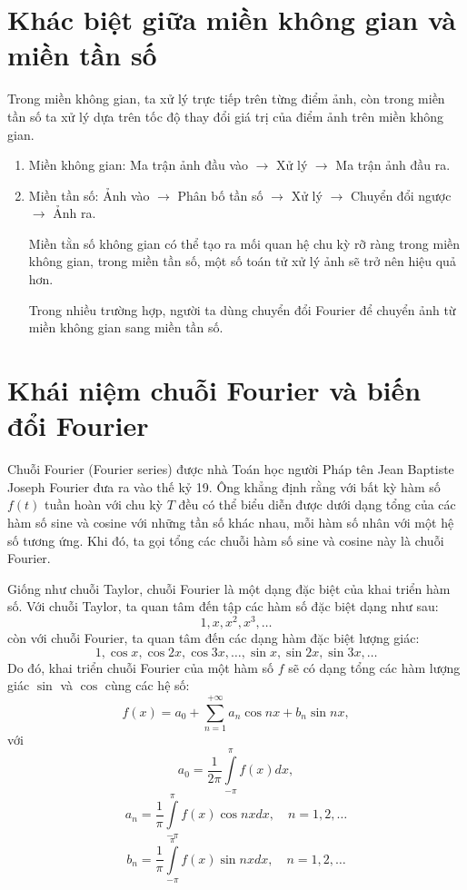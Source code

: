 \documentclass[12pt,a4paper]{report}
\numberwithin{equation}{section}
\theoremstyle{definition} %
\begin{document}
\section{Khác biệt giữa miền không gian và miền tần số}
Trong miền không gian, ta xử lý trực tiếp trên từng điểm ảnh, còn trong miền tần số ta xử lý dựa trên tốc độ thay đổi giá trị của điểm ảnh trên miền không gian.

\begin{enumerate}
    \item Miền không gian: Ma trận ảnh đầu vào $\rightarrow$ Xử lý $\rightarrow$ Ma trận ảnh đầu ra.

    \item Miền tần số: Ảnh vào $\rightarrow$ Phân bố tần số $\rightarrow$ Xử lý $\rightarrow$ Chuyển đổi ngược $\rightarrow$ Ảnh ra.

    Miền tằn số không gian có thể tạo ra mối quan hệ chu kỳ rỡ ràng trong miền không gian, trong miền tần số, một số toán tử xử lý ảnh sẽ trở nên hiệu quả hơn.

    Trong nhiều trường hợp, người ta dùng chuyển đổi Fourier để chuyển ảnh từ miền không gian sang miền tần số.
\end{enumerate}
\section{Khái niệm chuỗi Fourier và biến đổi Fourier}

     Chuỗi Fourier (Fourier series) được nhà Toán học người Pháp tên Jean Baptiste Joseph Fourier đưa ra vào thế kỷ 19. Ông khẳng định rằng với bất kỳ hàm số $f(t)$ tuần hoàn với chu kỳ $T$ đều có thể biểu diễn được dưới dạng tổng của các hàm số sine và cosine với những tần số khác nhau, mỗi hàm số nhân với một hệ số tương ứng. Khi đó, ta gọi tổng các chuỗi hàm số sine và cosine này là chuỗi Fourier.

		 Giống như chuỗi Taylor, chuỗi Fourier là một dạng đặc biệt của khai triển hàm số. 
		 Với chuỗi Taylor, ta quan tâm đến tập các hàm số đặc biệt dạng như sau: 
		\begin{equation}
		\tag{a}
		1,x,x^2,x^3,\ldots
		\end{equation}
		 còn với chuỗi Fourier, ta quan tâm đến các dạng hàm đặc biệt lượng giác:
		\begin{equation}
		\tag{b}
		1,\cos x, \cos 2x, \cos 3x,\ldots,\sin x,\sin 2x,\sin 3x,\ldots
		\end{equation}
		Do đó, khai triển chuỗi Fourier của một hàm số $f$ sẽ có dạng tổng các hàm lượng giác $\sin$ và $\cos$ cùng các hệ số:
		\begin{equation}
			\tag{c}
			f(x) = a_0 + \sum_{n=1}^{+\infty}a_n\cos nx + b_n\sin nx,
		\end{equation}
với 
\[a_0 = \dfrac{1}{2\pi}\int\limits_{-\pi}^{\pi}f(x)dx,\]
\[a_n = \dfrac{1}{\pi}\int\limits_{-\pi}^{\pi}f(x)\cos nxdx,\quad n=1,2,\ldots\]
\[b_n = \dfrac{1}{\pi}\int\limits_{-\pi}^{\pi}f(x)\sin nxdx,\quad n=1,2,\ldots\]
\end{document}
